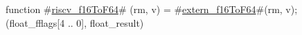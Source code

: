 function #\hyperref[sailRISCVzriscvzyf16ToF64]{riscv\_f16ToF64}# (rm, v) = {
  #\hyperref[sailRISCVzexternzyf16ToF64]{extern\_f16ToF64}#(rm, v);
  (float_fflags[4 .. 0], float_result)
}
